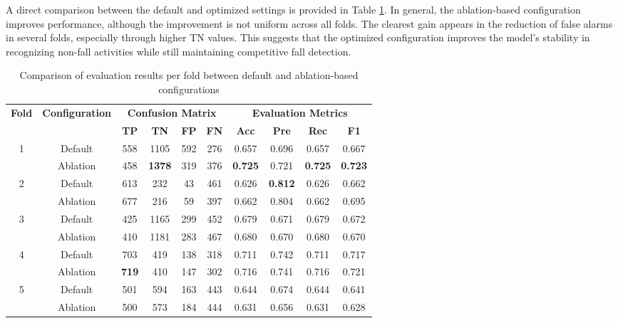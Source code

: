 \documentclass[10pt,TimesNewRoman,a4paper]{matrikenglish}
\begin{document}
A direct comparison between the default and optimized settings is provided in Table \ref{tab:perbandingan cm default ablasi}. In general, the ablation-based configuration improves performance, although the improvement is not uniform across all folds. The clearest gain appears in the reduction of false alarms in several folds, especially through higher TN values. This suggests that the optimized configuration improves the model's stability in recognizing non-fall activities while still maintaining competitive fall detection.

\begin{table}[H]
    \centering
    \caption{Comparison of evaluation results per fold between default and ablation-based configurations}
    \label{tab:perbandingan cm default ablasi}
    \begin{tabular}{c c c c c c c c c c}
        \hline
        \multirow{2}{*}{\textbf{Fold}} & \multirow{2}{*}{\textbf{Configuration}} & \multicolumn{4}{c}{\textbf{Confusion Matrix}} & \multicolumn{4}{c}{\textbf{Evaluation Metrics}} \\ \cline{3-10}
         & & \textbf{TP} & \textbf{TN} & \textbf{FP} & \textbf{FN} & \textbf{Acc} & \textbf{Pre} & \textbf{Rec} & \textbf{F1} \\ \hline
        1 & Default & 558 & 1105 & 592 & 276 & 0.657 & 0.696 & 0.657 & 0.667 \\ 
          & Ablation & 458 & \textbf{1378} & 319 & 376 & \textbf{0.725} & 0.721 & \textbf{0.725} & \textbf{0.723} \\ 
        2 & Default & 613 & 232 & 43 & 461 & 0.626 & \textbf{0.812} & 0.626 & 0.662 \\ 
          & Ablation & 677 & 216 & 59 & 397 & 0.662 & 0.804 & 0.662 & 0.695 \\ 
        3 & Default & 425 & 1165 & 299 & 452 & 0.679 & 0.671 & 0.679 & 0.672 \\ 
          & Ablation & 410 & 1181 & 283 & 467 & 0.680 & 0.670 & 0.680 & 0.670 \\
        4 & Default & 703 & 419 & 138 & 318 & 0.711 & 0.742 & 0.711 & 0.717 \\ 
          & Ablation & \textbf{719} & 410 & 147 & 302 & 0.716 & 0.741 & 0.716 & 0.721 \\ 
        5 & Default & 501 & 594 & 163 & 443 & 0.644 & 0.674 & 0.644 & 0.641 \\ 
          & Ablation & 500 & 573 & 184 & 444 & 0.631 & 0.656 & 0.631 & 0.628 \\ \hline
    \end{tabular}
\end{table}
\end{document}
